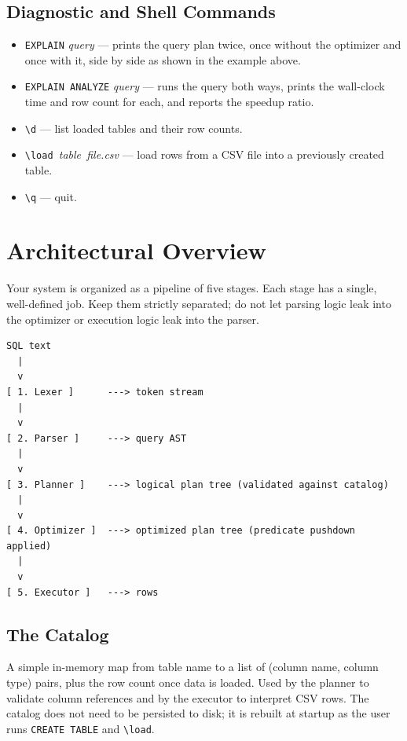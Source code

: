 \documentclass[11pt,a4paper]{article}
\begin{document}
\subsection{Diagnostic and Shell Commands}
\begin{itemize}
\item \texttt{EXPLAIN} \textit{query} --- prints the query plan twice, once without the optimizer and once with it, side by side as shown in the example above.
\item \texttt{EXPLAIN ANALYZE} \textit{query} --- runs the query both ways, prints the wall-clock time and row count for each, and reports the speedup ratio.
\item \verb|\d| --- list loaded tables and their row counts.
\item \verb|\load |\textit{table}\verb| |\textit{file.csv} --- load rows from a CSV file into a previously created table.
\item \verb|\q| --- quit.
\end{itemize}

\section{Architectural Overview}

Your system is organized as a pipeline of five stages. Each stage has a single, well-defined job. Keep them strictly separated; do not let parsing logic leak into the optimizer or execution logic leak into the parser.

\begin{codebox}
\begin{lstlisting}
SQL text
  |
  v
[ 1. Lexer ]      ---> token stream
  |
  v
[ 2. Parser ]     ---> query AST
  |
  v
[ 3. Planner ]    ---> logical plan tree (validated against catalog)
  |
  v
[ 4. Optimizer ]  ---> optimized plan tree (predicate pushdown applied)
  |
  v
[ 5. Executor ]   ---> rows
\end{lstlisting}
\end{codebox}

\subsection{The Catalog}
A simple in-memory map from table name to a list of (column name, column type) pairs, plus the row count once data is loaded. Used by the planner to validate column references and by the executor to interpret CSV rows. The catalog does not need to be persisted to disk; it is rebuilt at startup as the user runs \texttt{CREATE TABLE} and \verb|\load|.
\end{document}
